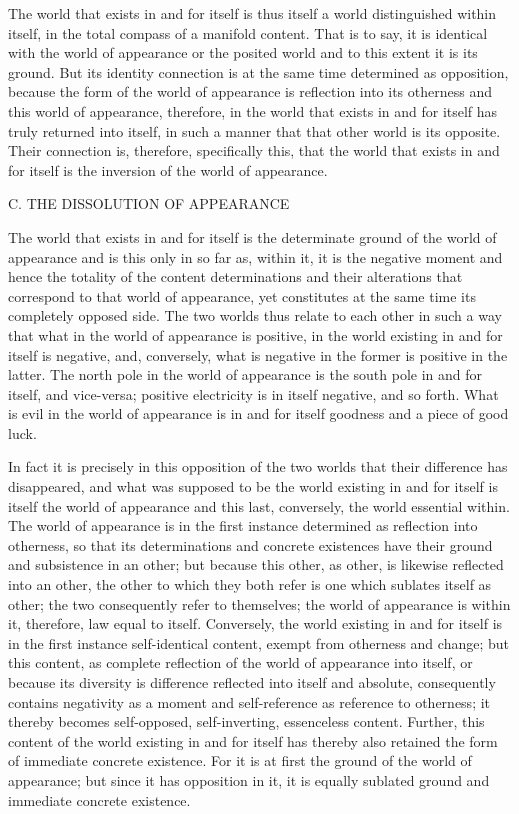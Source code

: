 The world that exists in and for itself is 
thus itself a world distinguished within itself,
in the total compass of a manifold content.
That is to say, it is identical with the world of appearance
or the posited world and to this extent it is its ground.
But its identity connection is at the same time
determined as opposition,
because the form of the world of appearance is
reflection into its otherness
and this world of appearance, therefore, in the
world that exists in and for itself
has truly returned into itself,
in such a manner that
that other world is its opposite.
Their connection is, therefore, specifically this,
that the world that exists in and for itself is
the inversion of the world of appearance.

C. THE DISSOLUTION OF APPEARANCE

The world that exists in and for itself is
the determinate ground of the world of appearance
and is this only in so far as, within it, it is the negative
moment and hence the totality of the content determinations and their
alterations that correspond to that world of appearance,
yet constitutes at the same time its completely opposed side.
The two worlds thus relate to each other in such a way
that what in the world of appearance is positive,
in the world existing in and for itself is negative,
and, conversely, what is negative in the former is
positive in the latter.
The north pole in the world of appearance is
the south pole in and for itself,  and vice-versa;
positive electricity is in itself negative, and so forth.
What is evil in the world of appearance is
in and for itself goodness and a piece of good luck.

In fact it is precisely in this opposition 
of the two worlds that their difference has disappeared, 
and what was supposed to be
the world existing in and for itself is
itself the world of appearance 
and this last, conversely,
the world essential within.
The world of appearance is in the first instance
determined as reflection into otherness,
so that its determinations and concrete existences have
their ground and subsistence in an other;
but because this other, as other,
is likewise reflected into an other,
the other to which they both refer is
one which sublates itself as other;
the two consequently refer to themselves;
the world of appearance is within it, 
therefore, law equal to itself.
Conversely, the world existing in and for itself is
in the first instance self-identical content,
exempt from otherness and change;
but this content, as complete reflection of
the world of appearance into itself,
or because its diversity is difference
reflected into itself and absolute,
consequently contains negativity as a moment
and self-reference as reference to otherness;
it thereby becomes self-opposed, self-inverting, essenceless content.
Further, this content of the world existing in and for itself has
thereby also retained the form of immediate concrete existence.
For it is at first the ground of the world of appearance;
but since it has opposition in it, it is equally
sublated ground and immediate concrete existence.

